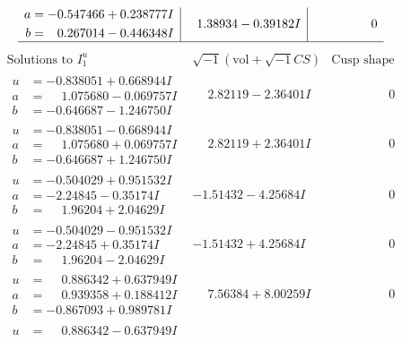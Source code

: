 \documentclass[1p]{elsarticle_modified}
\theoremstyle{definition}
\newcommand{\I}{\sqrt{-1}}
\begin{document}
$$\begin{array}{c|c|c}
\begin{aligned}
a &= -0.547466 + 0.238777 I \\
b &= \phantom{-}0.267014 - 0.446348 I\end{aligned}
 & \phantom{-}1.38934 - 0.39182 I & \phantom{-0.000000 } 0\\
 \hline 
 \end{array}$$\newpage$$\begin{array}{c|c|c}  
\text{Solutions to }I^u_{1}& \I (\text{vol} + \sqrt{-1}CS) & \text{Cusp shape}\\
 \hline 
\begin{aligned}
u &= -0.838051 + 0.668944 I \\
a &= \phantom{-}1.075680 - 0.069757 I \\
b &= -0.646687 - 1.246750 I\end{aligned}
 & \phantom{-}2.82119 - 2.36401 I & \phantom{-0.000000 } 0 \\ \hline\begin{aligned}
u &= -0.838051 - 0.668944 I \\
a &= \phantom{-}1.075680 + 0.069757 I \\
b &= -0.646687 + 1.246750 I\end{aligned}
 & \phantom{-}2.82119 + 2.36401 I & \phantom{-0.000000 } 0 \\ \hline\begin{aligned}
u &= -0.504029 + 0.951532 I \\
a &= -2.24845 - 0.35174 I \\
b &= \phantom{-}1.96204 + 2.04629 I\end{aligned}
 & -1.51432 - 4.25684 I & \phantom{-0.000000 } 0 \\ \hline\begin{aligned}
u &= -0.504029 - 0.951532 I \\
a &= -2.24845 + 0.35174 I \\
b &= \phantom{-}1.96204 - 2.04629 I\end{aligned}
 & -1.51432 + 4.25684 I & \phantom{-0.000000 } 0 \\ \hline\begin{aligned}
u &= \phantom{-}0.886342 + 0.637949 I \\
a &= \phantom{-}0.939358 + 0.188412 I \\
b &= -0.867093 + 0.989781 I\end{aligned}
 & \phantom{-}7.56384 + 8.00259 I & \phantom{-0.000000 } 0 \\ \hline\begin{aligned}
u &= \phantom{-}0.886342 - 0.637949 I \\

\end{aligned}
\end{array}$$
\end{document}

